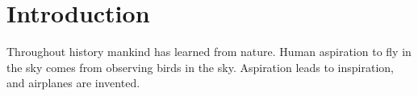 \chapter{Introduction}
Throughout history mankind has learned from nature. Human aspiration to fly in the sky comes from observing birds in the sky. Aspiration leads to inspiration, and airplanes are invented. 